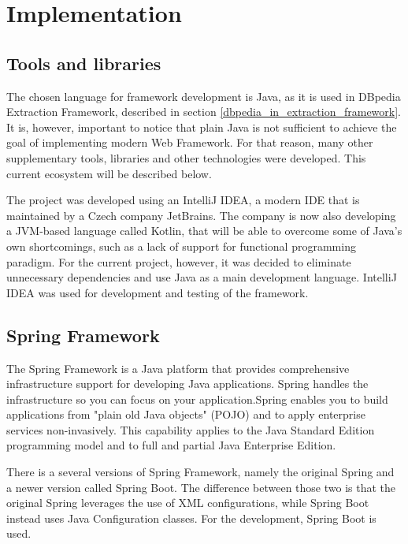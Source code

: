 \documentclass[thesis=M,english,hidelinks]{FITthesis}[2019/12/23]
\begin{document}
\section{Implementation}

\subsection{Tools and libraries}

The chosen language for framework development is Java, as it is used in DBpedia Extraction Framework, described in section \ref{dbpedia_in_extraction_framework}. It is, however, important to notice that plain Java is not sufficient to achieve the goal of implementing modern Web Framework. For that reason, many other supplementary tools, libraries and other technologies were developed. This current ecosystem will be described below.

The project was developed using an IntelliJ IDEA\cite{intellij_link}, a modern  \gls{IDE} that is maintained by a Czech company JetBrains. The company is now also developing a JVM-based language called Kotlin, that will be able to overcome some of Java's own shortcomings, such as a lack of support for functional programming paradigm. For the current project, however, it was decided to eliminate unnecessary dependencies and use Java as a main development language. IntelliJ IDEA was used for development and testing of the framework.

\subsection{Spring Framework}

The Spring Framework is a Java platform that provides comprehensive infrastructure support for developing Java applications. Spring handles the infrastructure so you can focus on your application.Spring enables you to build applications from "plain old Java objects" (\gls{POJO}) and to apply enterprise services non-invasively. This capability applies to the Java Standard Edition programming model and to full and partial Java Enterprise Edition\cite{spring_ref}.

There is a several versions of Spring Framework, namely the original Spring and a newer version called Spring Boot. The difference between those two is that the original Spring leverages the use of \gls{XML} configurations, while Spring Boot instead uses Java Configuration classes. For the development, Spring Boot is used.
\end{document}
